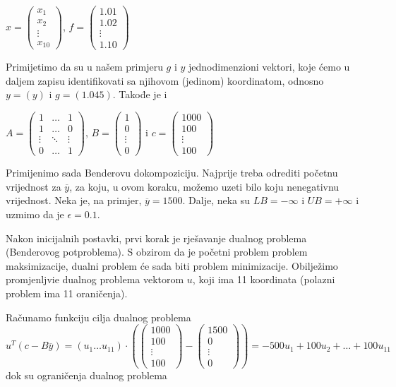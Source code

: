 \documentclass[a4paper, utf8, 11pt, colorlinks]{book}
\theoremstyle{definition}
\begin{document}
$x=\left(\begin{array}{c}
	x_1 \\
	x_2 \\
	\vdots \\
	x_{10}
\end{array}\right)$,  
$f = \left(\begin{array}{c}
	1.01 \\
	1.02 \\
	\vdots \\
	1.10
\end{array}\right)$

Primijetimo da su u našem primjeru $g$ i $y$ jednodimenzioni vektori, koje ćemo u daljem zapisu identifikovati sa njihovom (jedinom) koordinatom, odnosno
$y=(y)$ i $g=(1.045)$. Takođe je i 

$A=\left(
\begin{array}{ccc}
	1 & \ldots & 1 \\
	1 & \ldots & 0 \\
	\vdots & \ddots & \vdots \\
	0 & \ldots & 1
\end{array}\right)$, \quad
$B=\left(\begin{array}{c}
	1 \\
	0 \\
	\vdots \\
	0
\end{array}\right)$ i \quad 
$c=\left(\begin{array}{c}
	1000 \\
	100 \\
	\vdots \\
	100
\end{array}\right)$ 


Primijenimo sada Benderovu dokompoziciju. Najprije treba odrediti početnu vrijednost za $\overline{y}$, za koju, u ovom koraku, možemo uzeti bilo koju nenegativnu vrijednost. Neka je, na primjer, $\overline{y}=1500$. Dalje, neka su $LB=-\infty$ i $UB=+\infty$ i uzmimo da je $\epsilon = 0.1$.

 Nakon inicijalnih postavki, prvi korak je rješavanje dualnog problema (Benderovog potproblema). S obzirom da je početni problem problem maksimizacije, dualni problem će sada biti problem minimizacije. Obilježimo promjenljvie dualnog problema vektorom  $u$, koji ima 11 koordinata (polazni problem ima 11 oraničenja).
 
 Računamo funkciju cilja dualnog problema
 $$
u^T (c-B\overline{y})=(u_1\ldots u_{11})\cdot \left(\left(\begin{array}{c}
	1000 \\
	100 \\
	\vdots \\
	100
\end{array}\right)-\left(\begin{array}{c}
1500 \\
0 \\
\vdots \\
0
\end{array}\right)\right) = -500u_1+100u_2+\ldots+100u_{11}
$$
dok su ograničenja dualnog problema
\end{document}
